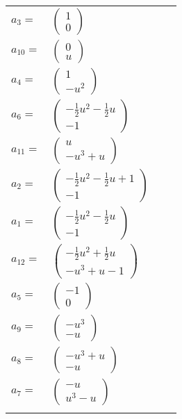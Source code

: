 \documentclass[1p]{elsarticle_modified}
\theoremstyle{definition}
\begin{document}
\begin{tabular}{m{7pt} m{180pt} m{7pt} m{180pt} }
\flushright $a_{3}=$&$\begin{pmatrix}1\\0\end{pmatrix}$ \\
\flushright $a_{10}=$&$\begin{pmatrix}0\\u\end{pmatrix}$ \\
\flushright $a_{4}=$&$\begin{pmatrix}1\\- u^2\end{pmatrix}$ \\
\flushright $a_{6}=$&$\begin{pmatrix}-\frac{1}{2} u^2-\frac{1}{2} u\\-1\end{pmatrix}$ \\
\flushright $a_{11}=$&$\begin{pmatrix}u\\- u^3+u\end{pmatrix}$ \\
\flushright $a_{2}=$&$\begin{pmatrix}-\frac{1}{2} u^2-\frac{1}{2} u+1\\-1\end{pmatrix}$ \\
\flushright $a_{1}=$&$\begin{pmatrix}-\frac{1}{2} u^2-\frac{1}{2} u\\-1\end{pmatrix}$ \\
\flushright $a_{12}=$&$\begin{pmatrix}-\frac{1}{2} u^2+\frac{1}{2} u\\- u^3+u-1\end{pmatrix}$ \\
\flushright $a_{5}=$&$\begin{pmatrix}-1\\0\end{pmatrix}$ \\
\flushright $a_{9}=$&$\begin{pmatrix}- u^3\\- u\end{pmatrix}$ \\
\flushright $a_{8}=$&$\begin{pmatrix}- u^3+u\\- u\end{pmatrix}$ \\
\flushright $a_{7}=$&$\begin{pmatrix}- u\\u^3- u\end{pmatrix}$\\&\end{tabular}
\end{document}
